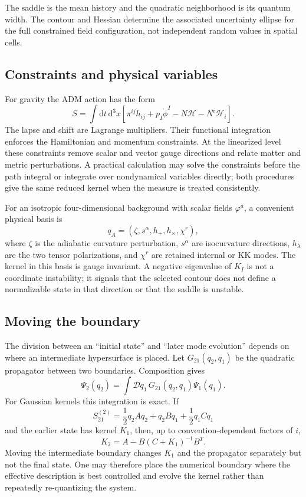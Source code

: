 \documentclass[aps,prd,twocolumn,superscriptaddress,nofootinbib,longbibliography,floatfix]{revtex4-2}
\newcommand{\dd}{\mathrm d}
\begin{document}
The saddle is the mean history and the quadratic neighborhood is its quantum width. The contour and Hessian determine the associated uncertainty ellipse for the full constrained field configuration, not independent random values in spatial cells.

\subsection{Constraints and physical variables}
For gravity the ADM action has the form
\begin{equation}
S=\int\dd t\,\dd^3x\left[\pi^{ij}\dot h_{ij}+p_I\dot\phi^I-N\mathcal H-N^i\mathcal H_i\right].
\end{equation}
The lapse and shift are Lagrange multipliers. Their functional integration enforces the Hamiltonian and momentum constraints. At the linearized level these constraints remove scalar and vector gauge directions and relate matter and metric perturbations. A practical calculation may solve the constraints before the path integral or integrate over nondynamical variables directly; both procedures give the same reduced kernel when the measure is treated consistently.

For an isotropic four-dimensional background with scalar fields $\varphi^a$, a convenient physical basis is
\begin{equation}
q_A=(\zeta,s^\alpha,h_+,h_\times,\chi^r),
\end{equation}
where $\zeta$ is the adiabatic curvature perturbation, $s^\alpha$ are isocurvature directions, $h_\lambda$ are the two tensor polarizations, and $\chi^r$ are retained internal or KK modes. The kernel in this basis is gauge invariant. A negative eigenvalue of $K_I$ is not a coordinate instability; it signals that the selected contour does not define a normalizable state in that direction or that the saddle is unstable.

\subsection{Moving the boundary}
The division between an ``initial state'' and ``later mode evolution'' depends on where an intermediate hypersurface is placed. Let $G_{21}(q_2,q_1)$ be the quadratic propagator between two boundaries. Composition gives
\begin{equation}
\Psi_2(q_2)=\int\mathcal Dq_1\,G_{21}(q_2,q_1)\Psi_1(q_1).
\end{equation}
For Gaussian kernels this integration is exact. If
\begin{equation}
S_{21}^{(2)}=\frac12q_2Aq_2+q_2Bq_1+\frac12q_1Cq_1
\end{equation}
and the earlier state has kernel $K_1$, then, up to convention-dependent factors of $i$,
\begin{equation}
K_2=A-B(C+K_1)^{-1}B^T.
\label{eq:compose}
\end{equation}
Moving the intermediate boundary changes $K_1$ and the propagator separately but not the final state. One may therefore place the numerical boundary where the effective description is best controlled and evolve the kernel rather than repeatedly re-quantizing the system.
\end{document}

